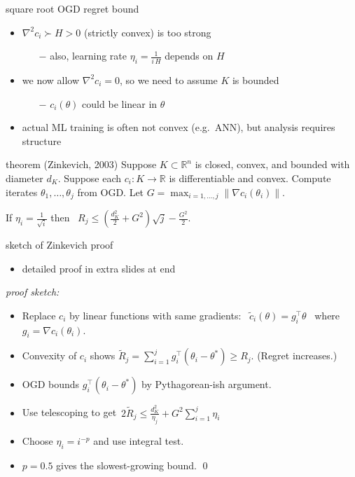 \documentclass[xcolor={svgnames},
               hyperref={colorlinks,citecolor=DeepPink4,linkcolor=FireBrick,urlcolor=Maroon}]
               {beamer}
\newcommand{\grad}{\nabla}
\newcommand{\RR}{\mathbb{R}}
\newcommand{\ds}{\displaystyle}
\begin{document}
\begin{frame}{square root OGD regret bound}

\begin{itemize}
\item $\grad^2 c_i \succ H > 0$ (strictly convex) is too strong
    \begin{itemize}
    \item[$-$] also, learning rate $\eta_i = \frac{1}{i\,H}$ depends on $H$
    \end{itemize}
\item we now allow $\grad^2 c_i = 0$, so we need to assume $K$ is bounded
    \begin{itemize}
    \item[$-$] $c_i(\theta)$ could be linear in $\theta$
    \end{itemize}
\item actual ML training is often not convex (e.g.~ANN), but analysis requires structure
\end{itemize}

\begin{block}{theorem (Zinkevich, 2003)}
Suppose $K\subset \RR^n$ is closed, convex, and bounded with diameter $d_K$.  Suppose each $c_i:K \to \RR$ is differentiable and convex.  Compute iterates $\theta_1,\dots,\theta_j$ from OGD.  Let $G = \max_{i=1,\dots,j} \|\grad c_i(\theta_i)\|$.

If $\ds \eta_i = \frac{1}{\sqrt{i}}$ then \, $\ds \boxed{R_j \le \left(\frac{d_K^2}{2} + G^2\right) \sqrt{j} - \frac{G^2}{2}.}$
\end{block}
\end{frame}


\begin{frame}{sketch of Zinkevich proof}
\begin{itemize}
\item detailed proof in extra slides at end
\end{itemize}

\bigskip
\noindent \emph{proof sketch:}

\begin{itemize}
\item Replace $c_i$ by linear functions with same gradients: \, $\tilde c_i(\theta) = g_i^\top \theta$ \, where $g_i = \grad c_i(\theta_i)$.
\item Convexity of $c_i$ shows {\small $\ds \tilde R_j = \sum_{i=1}^j g_i^\top (\theta_i - \theta^*) \ge R_j$}.  (Regret increases.)
\item OGD bounds $g_i^\top (\theta_i - \theta^*)$ by Pythagorean-ish argument.
\item Use telescoping to get\, $\ds 2 \tilde R_j \le \frac{d_K^2}{\eta_j} + G^2 \sum_{i=1}^j \eta_i$
\item Choose $\eta_i = i^{-p}$ and use integral test.
\item $p=0.5$ gives the slowest-growing bound. \hfill \qed
\end{itemize}
\end{frame}
\end{document}
